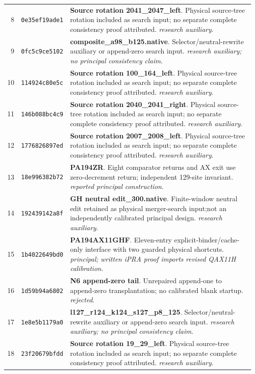 \begin{longtable}{@{}r p{} p{}@{}}
8 & \texttt{0e35ef19ade1} & \textbf{Source rotation 2041\_2047\_left}. Physical source-tree rotation included as search input; no separate complete consistency proof attributed. \emph{research auxiliary}.\\[3pt]
9 & \texttt{0fc5c9ce5102} & \textbf{composite\_a98\_b125.native}. Selector/neutral-rewrite auxiliary or append-zero search input. \emph{research auxiliary; no principal consistency claim}.\\[3pt]
10 & \texttt{114924c80e5c} & \textbf{Source rotation 100\_164\_left}. Physical source-tree rotation included as search input; no separate complete consistency proof attributed. \emph{research auxiliary}.\\[3pt]
11 & \texttt{146b088bc4c9} & \textbf{Source rotation 2040\_2041\_right}. Physical source-tree rotation included as search input; no separate complete consistency proof attributed. \emph{research auxiliary}.\\[3pt]
12 & \texttt{1776826897ed} & \textbf{Source rotation 2007\_2008\_left}. Physical source-tree rotation included as search input; no separate complete consistency proof attributed. \emph{research auxiliary}.\\[3pt]
13 & \texttt{18e996382b72} & \textbf{PA194ZR}. Eight comparator returns and AX exit use zero-decrement return; independent 129-site invariant. \emph{reported principal construction}.\\[3pt]
14 & \texttt{192439142a8f} & \textbf{GH neutral edit\_300.native}. Finite-window neutral edit retained as physical merger-search input;not an independently calibrated principal design. \emph{research auxiliary}.\\[3pt]
15 & \texttt{1b4022649bd0} & \textbf{PA194AX11GHF}. Eleven-entry explicit-binder/cache-only interface with two guarded physical shortcuts. \emph{principal; written iPRA proof imports revised QAX11H calibration}.\\[3pt]
16 & \texttt{1d59b94a6802} & \textbf{N6 append-zero tail}. Unrepaired append-one to append-zero transplantation; no calibrated blank startup. \emph{rejected}.\\[3pt]
17 & \texttt{1e8e5b1179a0} & \textbf{l127\_r124\_k124\_s127\_p8\_125}. Selector/neutral-rewrite auxiliary or append-zero search input. \emph{research auxiliary; no principal consistency claim}.\\[3pt]
18 & \texttt{23f20679bfdd} & \textbf{Source rotation 19\_29\_left}. Physical source-tree rotation included as search input; no separate complete consistency proof attributed. \emph{research auxiliary}.\\[3pt]

\end{longtable}
